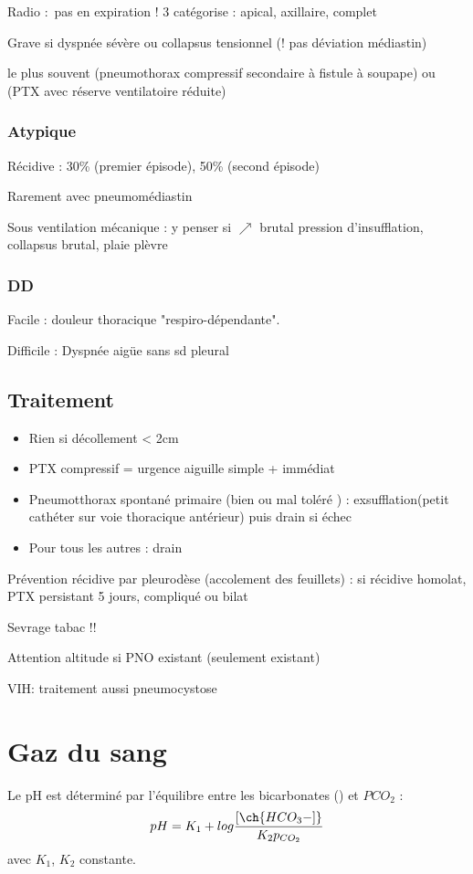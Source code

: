 \documentclass{book}
\begin{document}
Radio : pas en expiration ! 3 catégorise : apical, axillaire, complet

Grave si dyspnée sévère ou collapsus tensionnel (! pas déviation médiastin) 

\thus le plus souvent (pneumothorax compressif secondaire à fistule à
soupape) ou (PTX avec réserve ventilatoire réduite)

\subsubsection{Atypique}
\label{sec:orgacd1fda}
Récidive : 30\% (premier épisode), 50\% (second épisode)

Rarement avec pneumomédiastin

Sous ventilation mécanique : y penser si \(\nearrow\) brutal pression
d'insufflation, collapsus brutal, plaie plèvre

\subsubsection{DD}
\label{sec:orgc1ba456}
Facile : douleur thoracique "respiro-dépendante".

Difficile : Dyspnée aigüe sans sd pleural 

\subsection{Traitement}
\label{sec:orgfc77417}

\begin{itemize}
\item Rien si décollement < 2cm
\item PTX compressif = urgence \thus aiguille simple + immédiat
\item Pneumotthorax spontané primaire (bien ou mal toléré ) :
exsufflation(petit cathéter sur voie thoracique antérieur) puis drain
si échec
\item Pour tous les autres : drain
\end{itemize}


Prévention récidive par pleurodèse (accolement des feuillets) : si récidive
homolat, PTX persistant 5 jours, compliqué ou bilat

Sevrage tabac !!

Attention altitude si PNO existant (seulement existant)

VIH: traitement aussi pneumocystose


\section{Gaz du sang}
\label{sec:org521a05a}
\label{appendix:gds}
Le pH est déterminé par l'équilibre entre les bicarbonates () et
\(PCO_2\) :
\begin{equation}
  pH = K_1 + log\frac{[\ch{HCO_3-]}}{K_2 p_{CO_2}}
\end{equation}
avec \(K_1\), \(K_2\) constante.
\end{document}
